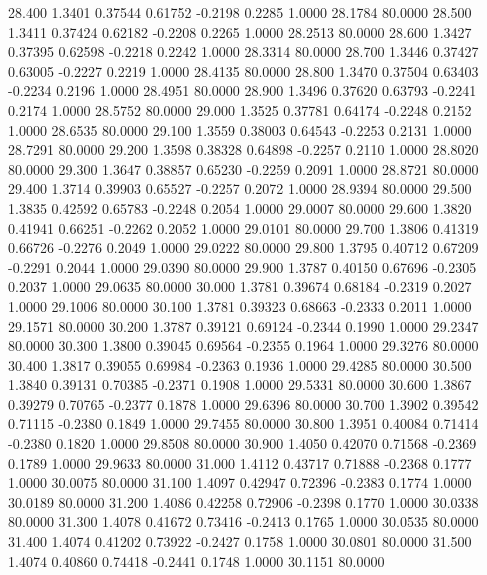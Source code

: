   28.400   1.3401   0.37544   0.61752  -0.2198   0.2285   1.0000  28.1784  80.0000
  28.500   1.3411   0.37424   0.62182  -0.2208   0.2265   1.0000  28.2513  80.0000
  28.600   1.3427   0.37395   0.62598  -0.2218   0.2242   1.0000  28.3314  80.0000
  28.700   1.3446   0.37427   0.63005  -0.2227   0.2219   1.0000  28.4135  80.0000
  28.800   1.3470   0.37504   0.63403  -0.2234   0.2196   1.0000  28.4951  80.0000
  28.900   1.3496   0.37620   0.63793  -0.2241   0.2174   1.0000  28.5752  80.0000
  29.000   1.3525   0.37781   0.64174  -0.2248   0.2152   1.0000  28.6535  80.0000
  29.100   1.3559   0.38003   0.64543  -0.2253   0.2131   1.0000  28.7291  80.0000
  29.200   1.3598   0.38328   0.64898  -0.2257   0.2110   1.0000  28.8020  80.0000
  29.300   1.3647   0.38857   0.65230  -0.2259   0.2091   1.0000  28.8721  80.0000
  29.400   1.3714   0.39903   0.65527  -0.2257   0.2072   1.0000  28.9394  80.0000
  29.500   1.3835   0.42592   0.65783  -0.2248   0.2054   1.0000  29.0007  80.0000
  29.600   1.3820   0.41941   0.66251  -0.2262   0.2052   1.0000  29.0101  80.0000
  29.700   1.3806   0.41319   0.66726  -0.2276   0.2049   1.0000  29.0222  80.0000
  29.800   1.3795   0.40712   0.67209  -0.2291   0.2044   1.0000  29.0390  80.0000
  29.900   1.3787   0.40150   0.67696  -0.2305   0.2037   1.0000  29.0635  80.0000
  30.000   1.3781   0.39674   0.68184  -0.2319   0.2027   1.0000  29.1006  80.0000
  30.100   1.3781   0.39323   0.68663  -0.2333   0.2011   1.0000  29.1571  80.0000
  30.200   1.3787   0.39121   0.69124  -0.2344   0.1990   1.0000  29.2347  80.0000
  30.300   1.3800   0.39045   0.69564  -0.2355   0.1964   1.0000  29.3276  80.0000
  30.400   1.3817   0.39055   0.69984  -0.2363   0.1936   1.0000  29.4285  80.0000
  30.500   1.3840   0.39131   0.70385  -0.2371   0.1908   1.0000  29.5331  80.0000
  30.600   1.3867   0.39279   0.70765  -0.2377   0.1878   1.0000  29.6396  80.0000
  30.700   1.3902   0.39542   0.71115  -0.2380   0.1849   1.0000  29.7455  80.0000
  30.800   1.3951   0.40084   0.71414  -0.2380   0.1820   1.0000  29.8508  80.0000
  30.900   1.4050   0.42070   0.71568  -0.2369   0.1789   1.0000  29.9633  80.0000
  31.000   1.4112   0.43717   0.71888  -0.2368   0.1777   1.0000  30.0075  80.0000
  31.100   1.4097   0.42947   0.72396  -0.2383   0.1774   1.0000  30.0189  80.0000
  31.200   1.4086   0.42258   0.72906  -0.2398   0.1770   1.0000  30.0338  80.0000
  31.300   1.4078   0.41672   0.73416  -0.2413   0.1765   1.0000  30.0535  80.0000
  31.400   1.4074   0.41202   0.73922  -0.2427   0.1758   1.0000  30.0801  80.0000
  31.500   1.4074   0.40860   0.74418  -0.2441   0.1748   1.0000  30.1151  80.0000
